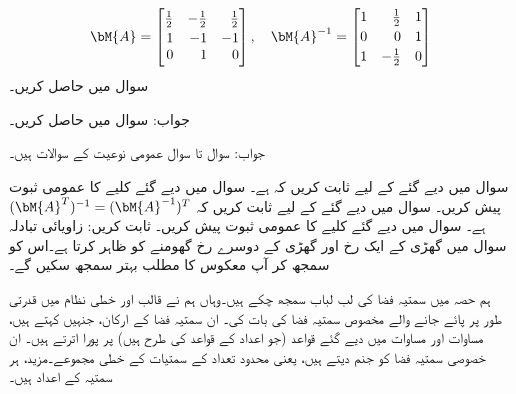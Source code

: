 \begin{align*}
\bM{A}=\begin{bmatrix*}[r] \frac{1}{2}&-\frac{1}{2}&\frac{1}{2}\\[0.5ex]1&-1&-1\\0&1&0\end{bmatrix*},\quad \bM{A}^{-1}=
\begin{bmatrix*}[r]1&\frac{1}{2}&1\\[0.5ex]0&0&1\\[0.5ex]1&-\frac{1}{2}&0\end{bmatrix*}
\end{align*}
سوال  میں  حاصل کریں۔

جواب:
سوال  میں  حاصل کریں۔

جواب:
سوال  تا سوال  عمومی نوعیت کے سوالات ہیں۔

سوال  میں دیے گئے  کے لیے  ثابت کریں کہ  ہے۔
سوال  میں دیے گئے کلیے کا عمومی ثبوت پیش کریں۔
سوال  میں دیے گئے  کے لیے  ثابت کریں کہ 
\begin{math}
(\bM{A}^T)^{-1}=(\bM{A}^{-1})^T
\end{math}
ہے۔
سوال  میں دیے گئے کلیے کا عمومی ثبوت پیش کریں۔
ثابت کریں:  
\quad زاویائی تبادلہ\\
سوال  میں   گھڑی کے  ایک رخ اور  گھڑی کے دوسرے رخ  گھومنے کو ظاہر کرتا  ہے۔اس کو سمجھ کر آپ معکوس کا مطلب بہتر سمجھ سکیں گے۔  

ہم حصہ  میں سمتیہ فضا کی لب لباب سمجھ چکے ہیں۔وہاں ہم نے قالب اور خطی نظام میں قدرتی طور پر پائے جانے والے مخصوص سمتیہ فضا کی بات کی۔ ان سمتیہ فضا کے ارکان، جنہیں  کہتے ہیں، مساوات  اور مساوات  میں دیے گئے قواعد (جو اعداد کے قواعد کی طرح ہیں) پر پورا اترتے ہیں۔ ان خصوصی سمتیہ فضا کو  جنم دیتے ہیں، یعنی محدود تعداد کے سمتیات کے خطی مجموعے۔مزید، ہر سمتیہ کے     اعداد ہیں۔

